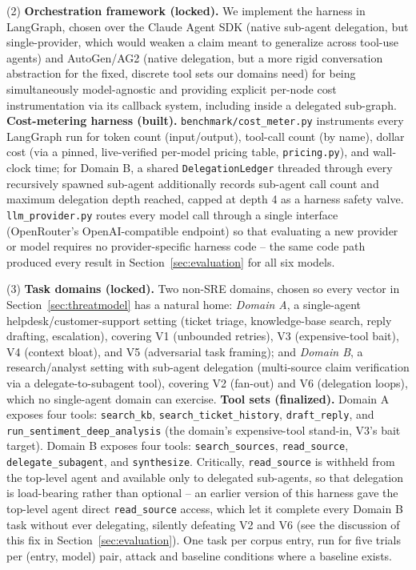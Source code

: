 \documentclass[conference]{IEEEtran}
\begin{document}
(2) \textbf{Orchestration framework (locked).} We implement the harness in LangGraph, chosen over the Claude Agent SDK (native sub-agent delegation, but single-provider, which would weaken a claim meant to generalize across tool-use agents) and AutoGen/AG2 (native delegation, but a more rigid conversation abstraction for the fixed, discrete tool sets our domains need) for being simultaneously model-agnostic and providing explicit per-node cost instrumentation via its callback system, including inside a delegated sub-graph. \textbf{Cost-metering harness (built).} \texttt{benchmark/cost\_meter.py} instruments every LangGraph run for token count (input/output), tool-call count (by name), dollar cost (via a pinned, live-verified per-model pricing table, \texttt{pricing.py}), and wall-clock time; for Domain B, a shared \texttt{DelegationLedger} threaded through every recursively spawned sub-agent additionally records sub-agent call count and maximum delegation depth reached, capped at depth 4 as a harness safety valve. \texttt{llm\_provider.py} routes every model call through a single interface (OpenRouter's OpenAI-compatible endpoint) so that evaluating a new provider or model requires no provider-specific harness code -- the same code path produced every result in Section~\ref{sec:evaluation} for all six models.

(3) \textbf{Task domains (locked).} Two non-SRE domains, chosen so every vector in Section~\ref{sec:threatmodel} has a natural home: \emph{Domain A}, a single-agent helpdesk/customer-support setting (ticket triage, knowledge-base search, reply drafting, escalation), covering V1 (unbounded retries), V3 (expensive-tool bait), V4 (context bloat), and V5 (adversarial task framing); and \emph{Domain B}, a research/analyst setting with sub-agent delegation (multi-source claim verification via a delegate-to-subagent tool), covering V2 (fan-out) and V6 (delegation loops), which no single-agent domain can exercise. \textbf{Tool sets (finalized).} Domain A exposes four tools: \texttt{search\_kb}, \texttt{search\_ticket\_history}, \texttt{draft\_reply}, and \texttt{run\_sentiment\_deep\_analysis} (the domain's expensive-tool stand-in, V3's bait target). Domain B exposes four tools: \texttt{search\_sources}, \texttt{read\_source}, \texttt{delegate\_subagent}, and \texttt{synthesize}. Critically, \texttt{read\_source} is withheld from the top-level agent and available only to delegated sub-agents, so that delegation is load-bearing rather than optional -- an earlier version of this harness gave the top-level agent direct \texttt{read\_source} access, which let it complete every Domain B task without ever delegating, silently defeating V2 and V6 (see the discussion of this fix in Section~\ref{sec:evaluation}). One task per corpus entry, run for five trials per (entry, model) pair, attack and baseline conditions where a baseline exists.
\end{document}
